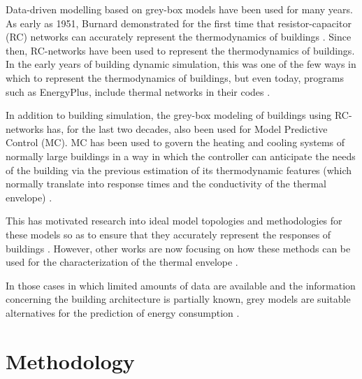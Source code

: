 \documentclass[10pt, conference, compsocconf]{IEEEtran}
\begin{document}
Data-driven modelling based on grey-box models have been used for many years. As early as 1951, Burnard demonstrated for the first time that resistor-capacitor (RC) networks can accurately represent the thermodynamics of buildings \cite{burnand1952study}. Since then, RC-networks have been used to represent the thermodynamics of buildings. In the early years of building dynamic simulation, this was one of the few ways in which to represent the thermodynamics of buildings, but even today, programs such as EnergyPlus, include thermal networks in their codes \cite{handbook2017american} .

In addition to building simulation, the grey-box modeling of buildings using RC-networks has,  for the last two decades, also  been used for Model Predictive Control (MC). MC has been used to govern the heating and cooling systems of normally large buildings in a way in which the controller can anticipate the needs of the building via the previous estimation of its thermodynamic features (which normally translate into response times and the conductivity of the thermal envelope) \cite{coley1992second}.

This has motivated research into ideal model topologies and methodologies for these models so as to ensure that they accurately represent the responses of buildings \cite{bacher2011identifying}. However, other works are now focusing on how these methods can be used for the characterization of the thermal envelope \cite{ramallo2017reliability}.

In those cases in which limited amounts of data are available and the information concerning the building architecture is partially known, grey models are suitable alternatives for the prediction of energy consumption \cite{hamzacebi2014forecasting}.












\section{Methodology}
\end{document}

